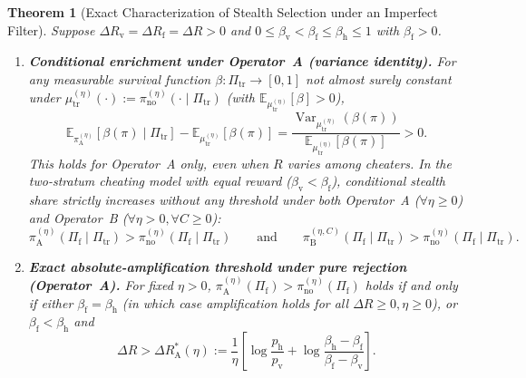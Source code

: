 \documentclass[11pt,a4paper]{article}
\newtheorem{theorem}{Theorem}
\newcommand{\E}{\mathbb{E}}
\newcommand{\Var}{\operatorname{Var}}
\begin{document}
\begin{theorem}[Exact Characterization of Stealth Selection under an Imperfect Filter]\label{thm:selection}
Suppose $\Delta R_{\mathrm{v}} = \Delta R_{\mathrm{f}} = \Delta R > 0$ and $0 \le \beta_{\mathrm{v}} < \beta_{\mathrm{f}} \le \beta_{\mathrm{h}} \le 1$ with $\beta_{\mathrm{f}} > 0$.
\begin{enumerate}
  \item \textbf{Conditional enrichment under Operator~A (variance identity).} For any measurable survival function $\beta : \Pi_{\mathrm{tr}} \to [0, 1]$ not almost surely constant under $\mu_{\mathrm{tr}}^{(\eta)}(\cdot) := \pi_{\mathrm{no}}^{(\eta)}(\cdot \mid \Pi_{\mathrm{tr}})$ (with $\E_{\mu_{\mathrm{tr}}^{(\eta)}}[\beta] > 0$),
  \begin{equation}\label{eq:variance}
    \E_{\pi_{\mathrm{A}}^{(\eta)}}[\beta(\pi) \mid \Pi_{\mathrm{tr}}] - \E_{\mu_{\mathrm{tr}}^{(\eta)}}[\beta(\pi)]
    = \frac{\Var_{\mu_{\mathrm{tr}}^{(\eta)}}(\beta(\pi))}{\E_{\mu_{\mathrm{tr}}^{(\eta)}}[\beta(\pi)]} > 0.
  \end{equation}
  This holds for Operator~A only, even when $R$ varies among cheaters. In the two-stratum cheating model with equal reward ($\beta_{\mathrm{v}} < \beta_{\mathrm{f}}$), conditional stealth share strictly increases without any threshold under both Operator~A ($\forall \eta \ge 0$) and Operator~B ($\forall \eta > 0, \forall C \ge 0$):
  \begin{equation}
    \pi_{\mathrm{A}}^{(\eta)}(\Pi_{\mathrm{f}} \mid \Pi_{\mathrm{tr}}) > \pi_{\mathrm{no}}^{(\eta)}(\Pi_{\mathrm{f}} \mid \Pi_{\mathrm{tr}})
    \qquad \text{and} \qquad
    \pi_{\mathrm{B}}^{(\eta, C)}(\Pi_{\mathrm{f}} \mid \Pi_{\mathrm{tr}}) > \pi_{\mathrm{no}}^{(\eta)}(\Pi_{\mathrm{f}} \mid \Pi_{\mathrm{tr}}).
  \end{equation}

  \item \textbf{Exact absolute-amplification threshold under pure rejection (Operator~A).} For fixed $\eta > 0$, $\pi_{\mathrm{A}}^{(\eta)}(\Pi_{\mathrm{f}}) > \pi_{\mathrm{no}}^{(\eta)}(\Pi_{\mathrm{f}})$ holds if and only if either $\beta_{\mathrm{f}} = \beta_{\mathrm{h}}$ (in which case amplification holds for all $\Delta R \ge 0, \eta \ge 0$), or $\beta_{\mathrm{f}} < \beta_{\mathrm{h}}$ and
  \begin{equation}\label{eq:ampA}
    \Delta R > \Delta R_{\mathrm{A}}^*(\eta)
    := \frac{1}{\eta}\left[\log\frac{p_{\mathrm{h}}}{p_{\mathrm{v}}} + \log\frac{\beta_{\mathrm{h}} - \beta_{\mathrm{f}}}{\beta_{\mathrm{f}} - \beta_{\mathrm{v}}}\right].
  \end{equation}


\end{enumerate}
\end{theorem}
\end{document}
